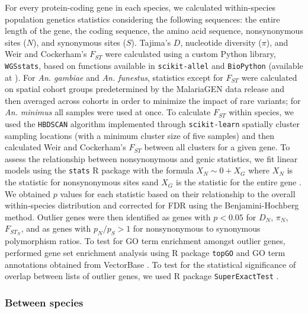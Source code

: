 For every protein-coding gene in each species, we calculated within-species
 population genetics statistics considering the following sequences: 
the entire length of the gene, the coding sequence, the amino acid sequence, 
nonsynonymous sites ($N$), and synonymous sites ($S$). 
Tajima's $D$, nucleotide diversity ($\pi$), %
and Weir and Cockerham's $F_{ST}$ were calculated using a custom Python library, 
\texttt{WGSstats}, based on functions available in \texttt{scikit-allel} and \texttt{BioPython} 
(available at ). 
For \textit{An. gambiae} and \textit{An. funestus}, statistics except for $F_{ST}$ 
were calculated on spatial cohort groups predetermined by the MalariaGEN data release 
\citep{gambiae, funestus} and then averaged across cohorts in order to minimize the impact of 
rare variants; for \textit{An. minimus} all samples were used at once.
To calculate $F_{ST}$ within species, we used the \texttt{HBDSCAN} algorithm implemented through \texttt{scikit-learn} 
spatially cluster sampling locations (with a minimum cluster size of five samples) and then
calculated Weir and Cockerham's $F_{ST}$ between all clusters for a given gene.
To assess the relationship between nonsynonymous and genic statistics,
 we fit linear models using the \texttt{stats} R package with the formula 
 $X_{N} \sim 0 + X_{G}$ where $X_{N}$ is the statistic for nonsynonymous sites 
 sand $X_{G}$ is the statistic for the entire gene \citep{Rstats}.
We obtained $p$ values for each statistic based on their relationship to the 
overall within-species distribution and corrected for FDR using the Benjamini-Hochberg method. 
Outlier genes were then identified as genes with $p < 0.05$ for $D_N$, $\pi_N$, $F_{ST_{N}}$, 
and as genes with ${p_{N}}/{p_{S}} > 1$ for nonsynonymous to synonymous polymorphism ratios.
To test for GO term enrichment amongst outlier genes, performed gene set enrichment analysis 
using R package \texttt{topGO} \citep{RtopGO} and GO term 
annotations obtained from VectorBase \citep{vectorbase}.
To test for the statistical significance of overlap between lists of outlier genes, 
we used R package \texttt{SuperExactTest} \citep{Rset}. 

\subsubsection{Between species} \label{sec:between}

